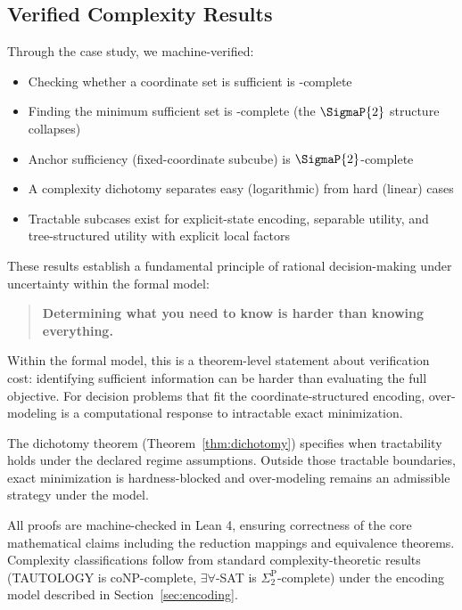 \subsection*{Verified Complexity Results}

Through the case study, we machine-verified:

\begin{itemize}
\item Checking whether a coordinate set is sufficient is \coNP-complete
\item Finding the minimum sufficient set is \coNP-complete (the $\SigmaP{2}$ structure collapses)
\item Anchor sufficiency (fixed-coordinate subcube) is $\SigmaP{2}$-complete
\item A complexity dichotomy separates easy (logarithmic) from hard (linear) cases
\item Tractable subcases exist for explicit-state encoding, separable utility, and tree-structured utility with explicit local factors
\end{itemize}

These results establish a fundamental principle of rational decision-making under uncertainty within the formal model:

\begin{quote}
\textbf{Determining what you need to know is harder than knowing everything.}
\end{quote}

Within the formal model, this is a theorem-level statement about verification cost: identifying sufficient information can be harder than evaluating the full objective. For decision problems that fit the coordinate-structured encoding, over-modeling is a computational response to intractable exact minimization.

The dichotomy theorem (Theorem~\ref{thm:dichotomy}) specifies when tractability holds under the declared regime assumptions. Outside those tractable boundaries, exact minimization is hardness-blocked and over-modeling remains an admissible strategy under the model.

All proofs are machine-checked in Lean 4, ensuring correctness of the core mathematical claims including the reduction mappings and equivalence theorems. Complexity classifications follow from standard complexity-theoretic results (TAUTOLOGY is coNP-complete, $\exists\forall$-SAT is $\Sigma_2^\text{P}$-complete) under the encoding model described in Section~\ref{sec:encoding}.

